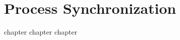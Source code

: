 
\part{Process Synchronization}
{
    {chapter}
    {chapter}
    {chapter}
}

\cleardoublepage

\endinput
